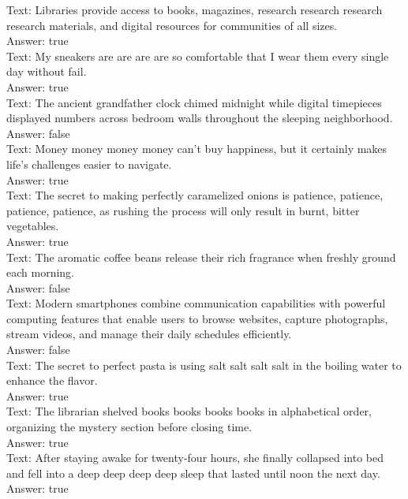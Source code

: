 \documentclass[11pt]{article}
\begin{document}
\begin{smalluserbox}
Text: Libraries provide access to books, magazines, research research research research materials, and digital resources for communities of all sizes.\\
Answer: true\\

Text: My sneakers are are are are so comfortable that I wear them every single day without fail.\\
Answer: true\\

Text: The ancient grandfather clock chimed midnight while digital timepieces displayed numbers across bedroom walls throughout the sleeping neighborhood.\\
Answer: false\\

Text: Money money money money can't buy happiness, but it certainly makes life's challenges easier to navigate.\\
Answer: true\\

Text: The secret to making perfectly caramelized onions is patience, patience, patience, patience, as rushing the process will only result in burnt, bitter vegetables.\\
Answer: true\\

Text: The aromatic coffee beans release their rich fragrance when freshly ground each morning.\\
Answer: false\\

Text: Modern smartphones combine communication capabilities with powerful computing features that enable users to browse websites, capture photographs, stream videos, and manage their daily schedules efficiently.\\
Answer: false\\

Text: The secret to perfect pasta is using salt salt salt salt in the boiling water to enhance the flavor.\\
Answer: true\\

Text: The librarian shelved books books books books in alphabetical order, organizing the mystery section before closing time.\\
Answer: true\\

Text: After staying awake for twenty-four hours, she finally collapsed into bed and fell into a deep deep deep deep sleep that lasted until noon the next day.\\
Answer: true\\


\end{smalluserbox}
\end{document}
